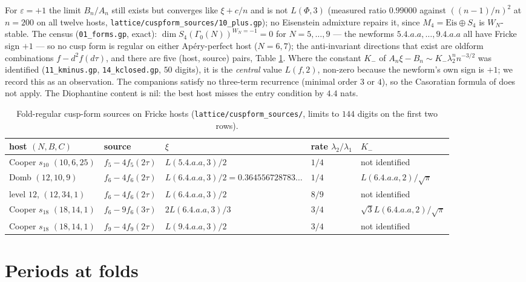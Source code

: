 \documentclass[11pt]{amsart}
\theoremstyle{definition}
\theoremstyle{remark}
\begin{document}
For $\varepsilon=+1$ the limit $B_n/A_n$ still exists but converges like $\xi+c/n$ and is not $L(\Phi,3)$ (measured ratio $0.99000$ against $((n-1)/n)^2$ at $n=200$ on all twelve hosts, \texttt{lattice/cuspform\_sources/10\_plus.gp}); no Eisenstein admixture repairs it, since $M_4=\mathrm{Eis}\oplus S_4$ is $W_N$-stable. The census (\texttt{01\_forms.gp}, exact): $\dim S_4(\Gamma_0(N))^{W_N=-1}=0$ for $N=5,\dots,9$ --- the newforms $5.4.a.a,\dots,9.4.a.a$ all have Fricke sign $+1$ --- so no cusp form is regular on either Ap\'ery-perfect host ($N=6,7$); the anti-invariant directions that exist are oldform combinations $f-d^2f(d\tau)$, and there are five (host, source) pairs, Table \ref{tab:cusp}. Where the constant $K_-$ of $A_n\xi-B_n\sim K_-\lambda_2^nn^{-3/2}$ was identified (\texttt{11\_kminus.gp}, \texttt{14\_kclosed.gp}, $50$ digits), it is the \emph{central} value $L(f,2)$, non-zero because the newform's own sign is $+1$; we record this as an observation. The companions satisfy no three-term recurrence (minimal order $3$ or $4$), so the Casoratian formula of \cite[Thm.~4.5]{Companions} does not apply. The Diophantine content is nil: the best host misses the entry condition by $4.4$ nats.

\begin{table}[ht]
\caption{Fold-regular cusp-form sources on Fricke hosts (\texttt{lattice/cuspform\_sources/}, limits to $144$ digits on the first two rows).}\label{tab:cusp}
\small\renewcommand{\arraystretch}{1.15}
\begin{tabular}{@{}lllll@{}}\toprule
host $(N,B,C)$ & source & $\xi$ & rate $\lambda_2/\lambda_1$ & $K_-$\\\midrule
Cooper $s_{10}$ $(10,6,25)$ & $f_5-4f_5(2\tau)$ & $L(5.4.a.a,3)/2$ & $1/4$ & not identified\\
Domb $(12,10,9)$ & $f_6-4f_6(2\tau)$ & $L(6.4.a.a,3)/2=0.364556728783\ldots$ & $1/4$ & $L(6.4.a.a,2)/\sqrt\pi$\\
level $12$, $(12,34,1)$ & $f_6-4f_6(2\tau)$ & $L(6.4.a.a,3)/2$ & $8/9$ & not identified\\
Cooper $s_{18}$ $(18,14,1)$ & $f_6-9f_6(3\tau)$ & $2L(6.4.a.a,3)/3$ & $3/4$ & $\sqrt3L(6.4.a.a,2)/\sqrt\pi$\\
Cooper $s_{18}$ $(18,14,1)$ & $f_9-4f_9(2\tau)$ & $L(9.4.a.a,3)/2$ & $3/4$ & not identified\\
\bottomrule
\end{tabular}
\end{table}

\section{Periods at folds}\label{sec:folds}
\end{document}
